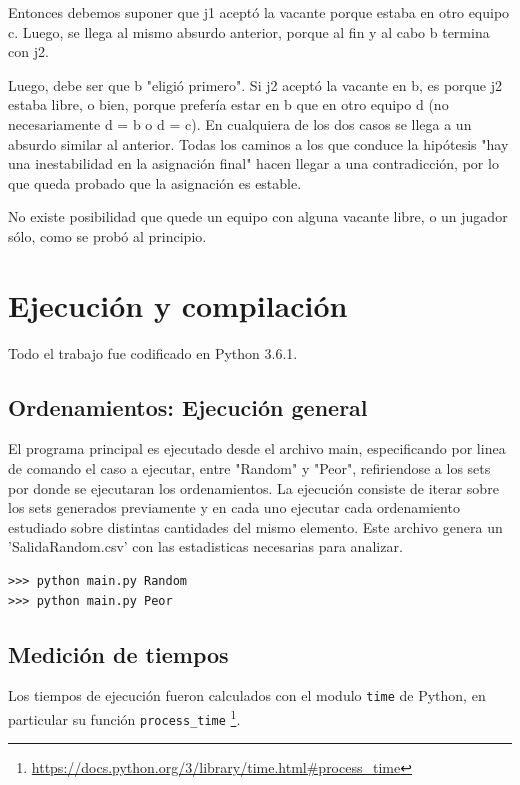 \documentclass[article,a4paper]{article}
\begin{document}
Entonces debemos suponer que j1 aceptó la vacante porque estaba en otro equipo c. Luego, se llega al mismo absurdo anterior, porque al fin y al cabo b termina con j2.

Luego, debe ser que b "eligió primero". Si j2 aceptó la vacante en b, es porque j2 estaba libre, o bien, porque prefería estar en b que en otro equipo d (no necesariamente d = b o d = c). En cualquiera de los dos casos se llega a un absurdo similar al anterior.
Todas los caminos a los que conduce la hipótesis "hay una inestabilidad en la asignación final" hacen llegar a una contradicción, por lo que queda probado que la asignación es estable.

No existe posibilidad que quede un equipo con alguna vacante libre, o un jugador sólo, como se probó al principio.


\newpage
\appendix

\section{Ejecución y compilación}

Todo el trabajo fue codificado en Python 3.6.1. 

\subsection{Ordenamientos: Ejecución general}

El programa principal es ejecutado desde el archivo main, especificando por linea de comando el caso a ejecutar, entre "Random" y "Peor", refiriendose a los sets por donde se ejecutaran los ordenamientos. La ejecución consiste de iterar sobre los sets generados previamente y en cada uno ejecutar cada ordenamiento estudiado sobre distintas cantidades del mismo elemento. Este archivo genera un 'SalidaRandom.csv' con las estadisticas necesarias para analizar.

\begin{verbatim}
>>> python main.py Random
>>> python main.py Peor
\end{verbatim}

\subsection{Medición de tiempos}
 Los tiempos de ejecución fueron calculados con el modulo \texttt{time} de Python, en particular su función \texttt{process\_time} \footnote{\url{https://docs.python.org/3/library/time.html\#process\_time}}.
\end{document}
